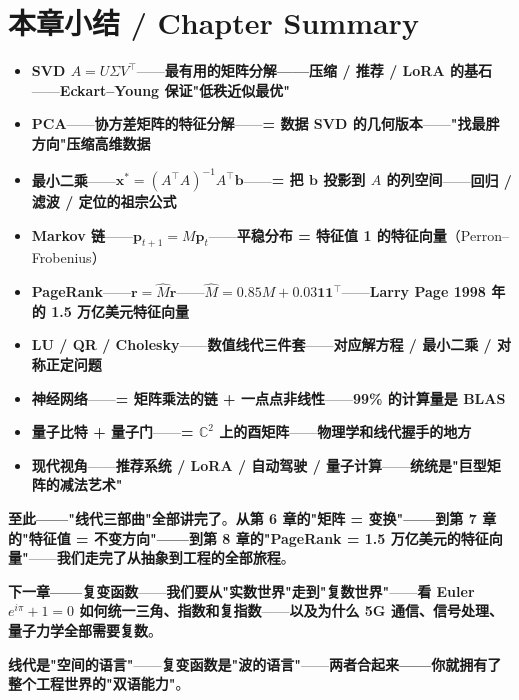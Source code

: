 \section{本章小结 / Chapter Summary}

\begin{tcolorbox}[essbox={本章核心}]
\begin{itemize}
\item \textbf{SVD $A = U \Sigma V^{\!\top}$}——\textbf{最有用的矩阵分解——压缩 / 推荐 / LoRA 的基石}——\textbf{Eckart--Young 保证"低秩近似最优"}
\item \textbf{PCA}——\textbf{协方差矩阵的特征分解}——\textbf{= 数据 SVD 的几何版本}——\textbf{"找最胖方向"压缩高维数据}
\item \textbf{最小二乘}——\textbf{$\bm{x}^* = (A^{\!\top} A)^{-1} A^{\!\top} \bm{b}$}——\textbf{= 把 $\bm{b}$ 投影到 $A$ 的列空间}——\textbf{回归 / 滤波 / 定位的祖宗公式}
\item \textbf{Markov 链}——\textbf{$\bm{p}_{t+1} = M \bm{p}_t$}——\textbf{平稳分布 = 特征值 1 的特征向量}（Perron--Frobenius）
\item \textbf{PageRank}——\textbf{$\bm{r} = \hat{M} \bm{r}$}——\textbf{$\hat{M} = 0.85 M + 0.03 \bm{1} \bm{1}^{\!\top}$}——\textbf{Larry Page 1998 年的 1.5 万亿美元特征向量}
\item \textbf{LU / QR / Cholesky}——\textbf{数值线代三件套}——\textbf{对应解方程 / 最小二乘 / 对称正定问题}
\item \textbf{神经网络}——\textbf{= 矩阵乘法的链 + 一点点非线性}——\textbf{99\% 的计算量是 BLAS}
\item \textbf{量子比特 + 量子门}——\textbf{= $\mathbb{C}^2$ 上的酉矩阵}——\textbf{物理学和线代握手的地方}
\item \textbf{现代视角}——\textbf{推荐系统 / LoRA / 自动驾驶 / 量子计算}——\textbf{统统是"巨型矩阵的减法艺术"}
\end{itemize}
\end{tcolorbox}

\textbf{至此——"线代三部曲"全部讲完了}。\textbf{从第 6 章的"矩阵 = 变换"——到第 7 章的"特征值 = 不变方向"——到第 8 章的"PageRank = 1.5 万亿美元的特征向量"}——\textbf{我们走完了从抽象到工程的全部旅程}。

\textbf{下一章——复变函数}——\textbf{我们要从"实数世界"走到"复数世界"}——\textbf{看 Euler $e^{i\pi} + 1 = 0$ 如何统一三角、指数和复指数}——\textbf{以及为什么 5G 通信、信号处理、量子力学全部需要复数}。

\textbf{线代是"空间的语言"}——\textbf{复变函数是"波的语言"}——\textbf{两者合起来——你就拥有了整个工程世界的"双语能力"}。

\clearpage
